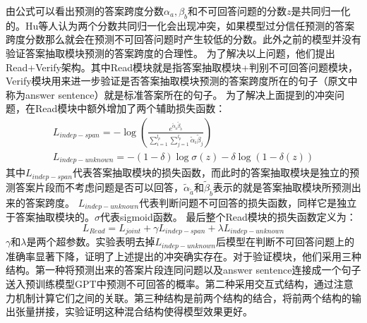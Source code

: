 由公式可以看出预测的答案跨度分数$\alpha_a,\beta_b$和不可回答问题的分数$z$是共同归一化的。Hu等人认为两个分数共同归一化会出现冲突，如果模型过分信任预测的答案跨度分数那么就会在预测不可回答问题时产生较低的分数。此外之前的模型并没有验证答案抽取模块预测的答案跨度的合理性。
为了解决以上问题，他们提出Read+Verify架构。其中Read模块就是指答案抽取模块+判别不可回答问题模块，
Verify模块用来进一步验证是否答案抽取模块预测的答案跨度所在的句子（原文中称为answer sentence）就是标准答案所在的句子。
为了解决上面提到的冲突问题，在Read模块中额外增加了两个辅助损失函数：
\begin{gather}
L_{indep-span}=-\log(\displaystyle\frac{e^{\widetilde{\alpha}_{\widetilde{a}}\widetilde{\beta}_{\widetilde{b}}}}{\sum_{i=1}^{l_p}\sum_{j=1}^{l_p}\widetilde{\alpha}_{i}\widetilde{\beta}_{j}}) \\
L_{indep-unknown}=-(1-\delta)\log\sigma(z)-\delta\log(1-\delta(z))
\end{gather}
其中$L_{indep-span}$代表答案抽取模块的损失函数，而此时的答案抽取模块是独立的预测答案片段而不考虑问题是否可以回答，$\widetilde{\alpha}_{\widetilde{a}}$和$\widetilde{\beta}_{\widetilde{b}}$表示的就是答案抽取模块所预测出来的答案跨度。
$L_{indep-unknown}$代表判断问题不可回答的损失函数，同样它是独立于答案抽取模块的。$\sigma$代表sigmoid函数。
最后整个Read模块的损失函数定义为：
\begin{equation}
L_{Read}=L_{joint}+\gamma L_{indep-span}+\lambda L_{indep-unknown}
\end{equation}
$\gamma$和$\lambda$是两个超参数。实验表明去掉$L_{indep-unknown}$后模型在判断不可回答问题上的准确率显著下降，证明了上述提出的冲突确实存在。对于验证模块，他们采用三种结构。第一种将预测出来的答案片段连同问题以及answer sentence连接成一个句子送入预训练模型GPT中预测不可回答的概率。第二种采用交互式结构，通过注意力机制计算它们之间的关联。第三种结构是前两个结构的结合，将前两个结构的输出张量拼接，实验证明这种混合结构使得模型效果更好。




